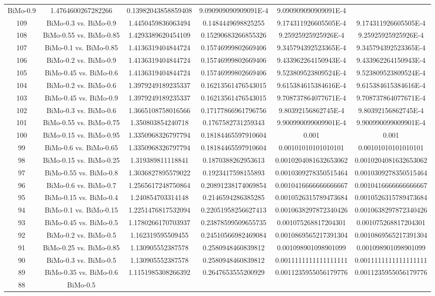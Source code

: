 \documentclass[a4paper,10pt]{article}
\begin{document}
\begin{landscape}
\begin{table}[!htp]
\begin{tabular}{cccccc}
BiMo-0.9&1.4764600267282266&0.13982043858859408&9.090909090909091E-4&9.090909090909091E-4\\109&BiMo-0.3 vs. BiMo-0.9&1.4450459836063494&0.1484449698825255&9.174311926605505E-4&9.174311926605505E-4\\108&BiMo-0.55 vs. BiMo-0.85&1.4293389620454109&0.15290683266855326&9.25925925925926E-4&9.25925925925926E-4\\107&BiMo-0.1 vs. BiMo-0.85&1.4136319404844724&0.15746999802669406&9.345794392523365E-4&9.345794392523365E-4\\106&BiMo-0.2 vs. BiMo-0.9&1.4136319404844724&0.15746999802669406&9.433962264150943E-4&9.433962264150943E-4\\105&BiMo-0.45 vs. BiMo-0.6&1.4136319404844724&0.15746999802669406&9.523809523809524E-4&9.523809523809524E-4\\104&BiMo-0.2 vs. BiMo-0.6&1.3979249189235337&0.16213561476543015&9.615384615384616E-4&9.615384615384616E-4\\103&BiMo-0.45 vs. BiMo-0.9&1.3979249189235337&0.16213561476543015&9.708737864077671E-4&9.708737864077671E-4\\102&BiMo-0.3 vs. BiMo-0.6&1.3665108758016566&0.17177866961796756&9.80392156862745E-4&9.80392156862745E-4\\101&BiMo-0.55 vs. BiMo-0.75&1.350803854240718&0.1767582731259343&9.900990099009901E-4&9.900990099009901E-4\\100&BiMo-0.15 vs. BiMo-0.95&1.3350968326797794&0.18184465597910604&0.001&0.001\\99&BiMo-0.6 vs. BiMo-0.65&1.3350968326797794&0.18184465597910604&0.00101010101010101&0.00101010101010101\\98&BiMo-0.15 vs. BiMo-0.25&1.319389811118841&0.1870388262953613&0.0010204081632653062&0.0010204081632653062\\97&BiMo-0.55 vs. BiMo-0.8&1.3036827895579022&0.1923417598155893&0.0010309278350515464&0.0010309278350515464\\96&BiMo-0.6 vs. BiMo-0.7&1.2565617248750864&0.20891238174069854&0.0010416666666666667&0.0010416666666666667\\95&BiMo-0.15 vs. BiMo-0.4&1.240854703314148&0.2146594286385285&0.0010526315789473684&0.0010526315789473684\\94&BiMo-0.1 vs. BiMo-0.15&1.2251476817532094&0.22051958256627413&0.0010638297872340426&0.0010638297872340426\\93&BiMo-0.45 vs. BiMo-0.5&1.1780266170703937&0.23878599509655735&0.001075268817204301&0.001075268817204301\\92&BiMo-0.2 vs. BiMo-0.5&1.162319595509455&0.24510566982469084&0.0010869565217391304&0.0010869565217391304\\91&BiMo-0.25 vs. BiMo-0.85&1.130905552387578&0.2580948460839812&0.001098901098901099&0.001098901098901099\\90&BiMo-0.3 vs. BiMo-0.5&1.130905552387578&0.2580948460839812&0.0011111111111111111&0.0011111111111111111\\89&BiMo-0.35 vs. BiMo-0.6&1.1151985308266392&0.2647653555200929&0.0011235955056179776&0.0011235955056179776\\88&BiMo-0.5 
\end{tabular}
\end{table}
\end{landscape}
\end{document}
